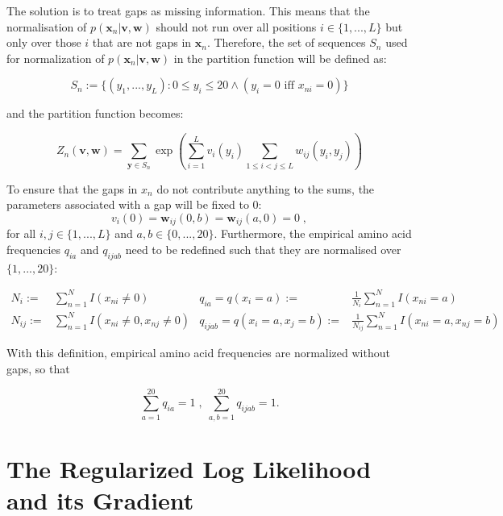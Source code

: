 \documentclass[12pt,a4paper,twoside]{book}
\newcommand{\eq}{\!=\!}
\newcommand{\seq}{\mathbf{x}}
\newcommand{\Sn}{S_n}
\renewcommand{\v}{\mathbf{v}}
\newcommand{\vi}{v_{i}}
\newcommand{\w}{\mathbf{w}}
\newcommand{\wij}{\mathbf{w}_{ij}}
\theoremstyle{definition}
\theoremstyle{definition}
\theoremstyle{remark}
\begin{document}
The solution is to treat gaps as missing information. This means that
the normalisation of \(p(\seq_n | \v, \w)\) should not run over all
positions \(i \in \{1,... , L\}\) but only over those \(i\) that are not
gaps in \(\seq_n\). Therefore, the set of sequences \(\Sn\) used for
normalization of \(p(\seq_n | \v, \w)\) in the partition function will
be defined as:

\begin{equation}
\Sn := \{(y_1,... , y_L): 0 \leq y_i \leq 20 \land (y_i \eq 0 \textrm{ iff } x_{ni} \eq 0) \}
\end{equation}

and the partition function becomes:

\begin{equation}
  Z_n(\v, \w) = \sum_{\mathbf{y} \in \Sn} \exp \left( \sum_{i=1}^L v_i(y_i) \sum_{1 \leq i < j \leq L} w_{ij}(y_i, y_j)  \right)
\end{equation}

To ensure that the gaps in \(x_n\) do not contribute anything to the
sums, the parameters associated with a gap will be fixed to 0: \[
\vi(0) = \wij(0, b) = \wij(a, 0) = 0 \; ,
\] for all \(i, j \in \{1, ..., L\}\) and \(a, b \in \{0, ..., 20\}\).
Furthermore, the empirical amino acid frequencies \(q_{ia}\) and
\(q_{ijab}\) need to be redefined such that they are normalised over
\(\{1, ..., 20\}\):

\begin{align}
   N_i :=& \sum_{n=1}^N  I(x_{ni} \!\ne\! 0) &  q_{ia} = q(x_i \eq a) :=& \frac{1}{N_i} \sum_{n=1}^N I(x_{ni} \eq a)   \\
   N_{ij} :=& \sum_{n=1}^N  I(x_{ni} \!\ne\! 0, x_{nj} \!\ne\! 0)  &  q_{ijab} = q(x_i \eq a, x_j \eq b) :=& \frac{1}{N_{ij}} \sum_{n=1}^N I(x_{ni} \eq a, x_{nj} \eq b)
\end{align}

With this definition, empirical amino acid frequencies are normalized
without gaps, so that

\begin{equation}
    \sum_{a=1}^{20} q_{ia} = 1      \; , \;     \sum_{a,b=1}^{20} q_{ijab} = 1.
\label{eq:normalized-emp-freq}
\end{equation}

\section{The Regularized Log Likelihood and its
Gradient}\label{the-regularized-log-likelihood-and-its-gradient}
\end{document}

